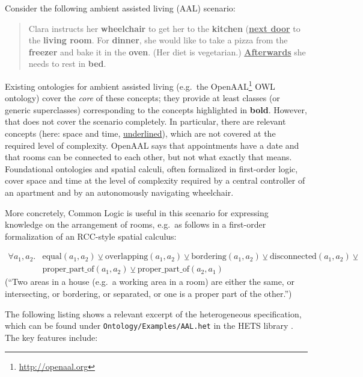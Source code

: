 \documentclass{article}
\newcommand{\normalTEXTSC}[2]{{#1\scriptsize#2}}
\newcommand     {\Hets}{\normalTEXTSC{H}{ETS}\xspace}
\begin{document}
Consider the following ambient assisted living (AAL) scenario:
\begin{quote}
  Clara instructs her \textbf{wheelchair} to get her to the \textbf{kitchen} (\textbf{\underline{next door}} to the \textbf{living room}.  For \textbf{dinner}, she would like to take a pizza from the \textbf{freezer} and bake it in the \textbf{oven}.  (Her diet is vegetarian.)  \textbf{\underline{Afterwards}} she needs to rest in \textbf{bed}.
\end{quote}
Existing ontologies for ambient assisted living (e.g.\ the OpenAAL\footnote{\url{http://openaal.org}} OWL ontology) cover the \emph{core} of these  concepts; they provide at least classes (or generic superclasses) corresponding to the concepts highlighted in \textbf{bold}.  However, that does not cover the scenario completely.  In particular, there are relevant concepts (here: space and time, \underline{underlined}), which are not covered at the required level of complexity.  OpenAAL says that appointments have a date and that rooms can be connected to each other, but not what exactly that means.  Foundational ontologies and spatial calculi, often formalized in first-order logic, cover space and time at the level of complexity required by a central controller of an apartment and by an autonomously navigating wheelchair.

More concretely, Common Logic is useful in this scenario for expressing knowledge on the arrangement of rooms, e.g.\ as follows in a first-order formalization of an RCC-style spatial calculus:

\begin{align*}
  \forall a_1, a_2 .&\mathrm{equal}(a_1, a_2) \veebar \mathrm{overlapping}(a_1, a_2) \veebar \mathrm{bordering}(a_1, a_2) \veebar \mathrm{disconnected}(a_1, a_2) \veebar\\
  &\mathrm{proper\_part\_of}(a_1, a_2) \veebar \mathrm{proper\_part\_of}(a_2, a_1)
\end{align*}
(“Two areas in a house (e.g.\ a working area in a room) are either the same, or intersecting, or bordering, or separated, or one is a proper part of the other.”)

The following listing shows a relevant excerpt of the heterogeneous specification, which can be found 
under \texttt{Ontology/Examples/AAL.het} in the \Hets library \cite{hets-library:URL}.  The key features include:
\end{document}
